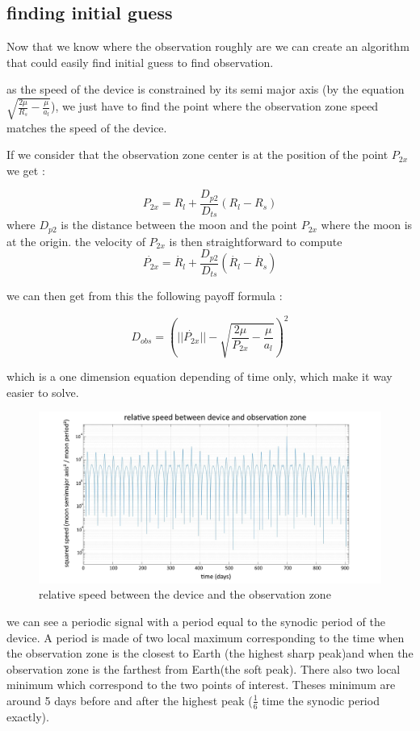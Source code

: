 \documentclass[11pt]{article} %
\begin{document}
		\subsection{finding initial guess}
		
		Now that we know where the observation roughly are we can create an algorithm that could easily find initial guess to find observation.
		
		as the speed of the device is constrained by its semi major axis (by the equation $\sqrt{\frac{2\mu}{R_s}-\frac{\mu}{a_l}}$), we just have to find the point where the observation zone speed matches the speed of the device.
			
		If we consider that the observation zone center is at the position of the point $P_{2x}$ we get :
		
		$$
		P_{2x}=R_l+\frac{D_{p2}}{D_{ts}}(R_l-R_s)
		$$
		where $D_{p2}$ is the distance between the moon and the point $P_{2x}$ where the moon is at the origin.
		the velocity of $P_{2x}$ is then straightforward to compute
		$$
		\dot{P_{2x}}=\dot{R_l}+\frac{D_{p2}}{D_{ts}}(\dot{R_l}-\dot{R_s})
		$$
		
		we can then get from this the following payoff formula :
		
		$$
		D_{obs}=\left(||\dot{P_{2x}}||-\sqrt{\frac{2\mu}{P_{2x}}-\frac{\mu}{a_l}}\right)^2
		$$  
		
		which is a one dimension equation depending of time only, which make it way easier to solve.
		
		\begin{figure}[h]
			\includegraphics[width==1\textwidth]{images/graph.jpg}
			\caption{relative speed between the device and the observation zone}
		\end{figure}
		
		we can see a periodic signal with a period equal to the synodic period of the device. A period is made of two local maximum corresponding to the time when the observation zone is the closest to Earth (the highest sharp peak)and when the observation zone is the farthest from Earth(the soft peak). There also two local minimum which correspond to the two points of interest. Theses minimum are around 5 days before and after the highest peak ($\frac{1}{6}$ time the synodic period exactly). 
		
\end{document}
